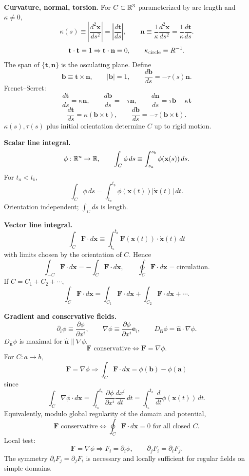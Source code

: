 \noindent\textbf{Curvature, normal, torsion.}\quad
For $C\subset\mathbb{R}^3$ parameterized by arc length and $\kappa\ne0$,
\[
\kappa(s)\equiv
\left|\frac{d^2\mathbf{x}}{ds^2}\right|
=\left|\frac{d\mathbf{t}}{ds}\right|,
\qquad
\mathbf{n}\equiv
\frac{1}{\kappa}\frac{d^2\mathbf{x}}{ds^2}
=\frac{1}{\kappa}\frac{d\mathbf{t}}{ds}.
\]
\[
\mathbf{t}\cdot\mathbf{t}=1\Rightarrow\mathbf{t}\cdot\mathbf{n}=0,
\qquad
\kappa_{\rm circle}=R^{-1}.
\]
The span of $\{\mathbf{t},\mathbf{n}\}$ is the osculating plane. Define
\[
\mathbf{b}\equiv\mathbf{t}\times\mathbf{n},\qquad
|\mathbf{b}|=1,\qquad
\frac{d\mathbf{b}}{ds}=-\tau(s)\mathbf{n}.
\]
Frenet--Serret:
\[
\boxed{
\frac{d\mathbf{t}}{ds}=\kappa\mathbf{n},\qquad
\frac{d\mathbf{b}}{ds}=-\tau\mathbf{n},\qquad
\frac{d\mathbf{n}}{ds}=\tau\mathbf{b}-\kappa\mathbf{t}}
\]
\[
\frac{d\mathbf{t}}{ds}=\kappa(\mathbf{b}\times\mathbf{t}),
\qquad
\frac{d\mathbf{b}}{ds}=-\tau(\mathbf{b}\times\mathbf{t}).
\]
$\kappa(s),\tau(s)$ plus initial orientation determine $C$ up to rigid motion.

\noindent\textbf{Scalar line integral.}
\[
\phi:\mathbb{R}^n\to\mathbb{R},\qquad
\int_C\phi\,ds\equiv\int_{s_a}^{s_b}\phi(\mathbf{x}(s))\,ds.
\]
For $t_a<t_b$,
\[
\boxed{\int_C\phi\,ds
=\int_{t_a}^{t_b}\phi(\mathbf{x}(t))|\dot{\mathbf{x}}(t)|\,dt.}
\]
Orientation independent; $\int_C ds$ is length.

\noindent\textbf{Vector line integral.}
\[
\boxed{\int_C\mathbf{F}\cdot d\mathbf{x}
\equiv\int_{t_a}^{t_b}
\mathbf{F}(\mathbf{x}(t))\cdot\dot{\mathbf{x}}(t)\,dt}
\]
with limits chosen by the orientation of $C$. Hence
\[
\int_{-C}\mathbf{F}\cdot d\mathbf{x}=
-\int_C\mathbf{F}\cdot d\mathbf{x},\qquad
\oint_C\mathbf{F}\cdot d\mathbf{x}=\text{circulation}.
\]
If $C=C_1+C_2+\cdots$,
\[
\int_C\mathbf{F}\cdot d\mathbf{x}
=\int_{C_1}\mathbf{F}\cdot d\mathbf{x}
+\int_{C_2}\mathbf{F}\cdot d\mathbf{x}+\cdots .
\]

\noindent\textbf{Gradient and conservative fields.}
\[
\partial_i\phi\equiv\frac{\partial\phi}{\partial x^i},
\qquad
\nabla\phi\equiv\frac{\partial\phi}{\partial x^i}\mathbf{e}_i,
\qquad
D_{\hat{\mathbf{n}}}\phi=\hat{\mathbf{n}}\cdot\nabla\phi.
\]
$D_{\hat{\mathbf{n}}}\phi$ is maximal for $\hat{\mathbf{n}}\parallel\nabla\phi$.
\[
\mathbf{F}\text{ conservative}\Longleftrightarrow \mathbf{F}=\nabla\phi.
\]
For $C:a\to b$,
\[
\boxed{\mathbf{F}=\nabla\phi\Rightarrow
\int_C\mathbf{F}\cdot d\mathbf{x}=\phi(\mathbf{b})-\phi(\mathbf{a})}
\]
since
\[
\int_C\nabla\phi\cdot d\mathbf{x}
=\int_{t_a}^{t_b}\frac{\partial\phi}{\partial x^i}
\frac{dx^i}{dt}\,dt
=\int_{t_a}^{t_b}\frac{d}{dt}\phi(\mathbf{x}(t))\,dt.
\]
Equivalently, modulo global regularity of the domain and potential,
\[
\boxed{\mathbf{F}\text{ conservative}
\Longleftrightarrow
\oint_C\mathbf{F}\cdot d\mathbf{x}=0\text{ for all closed }C.}
\]
Local test:
\[
\mathbf{F}=\nabla\phi\Rightarrow
F_i=\partial_i\phi,\qquad
\partial_jF_i=\partial_iF_j.
\]
The symmetry $\partial_iF_j=\partial_jF_i$ is necessary and locally sufficient for
regular fields on simple domains.

